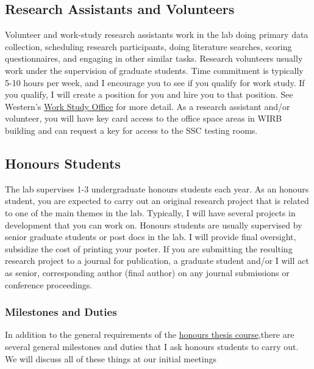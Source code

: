 \documentclass{article}
\begin{document}

\subsection {Research Assistants and Volunteers}
Volunteer and work-study research assistants work in the lab doing primary data collection, scheduling research participants, doing literature searches, scoring questionnaires, and engaging in other similar tasks. Research volunteers usually work under the supervision of graduate students. Time commitment is typically 5-10 hours per week, and I encourage you to see if you qualify for work study. If you qualify, I will create a position for you and hire you to that position. See Western's \href{https://workstudy.uwo.ca/}{Work Study Office} for more detail. As a research assistant and/or volunteer, you will have key card access to the office space areas in WIRB building and can request a key for access to the SSC testing rooms.
 
\subsection {Honours Students}
The lab supervises 1-3 undergraduate honours students each year. As an honours student, you are expected to carry out an original research project that is related to one of the main themes in the lab. Typically, I will have several projects in development that you can work on. Honours students are usually supervised by senior graduate students or post docs in the lab. I will provide final oversight, subsidize the cost of printing your poster. If you are submitting the resulting research project to a journal for publication, a graduate student and/or I will act as senior, corresponding author (final author) on any journal submissions or conference proceedings.

\subsubsection{Milestones and Duties}
In addition to the general requirements of the \href{http://psychology.uwo.ca/undergraduate/honors_thesis/index.html} {honours thesis course},there are several general milestones and duties that I ask honours students to carry out. We will discuss all of these things at our initial meetings 
\end{document}
